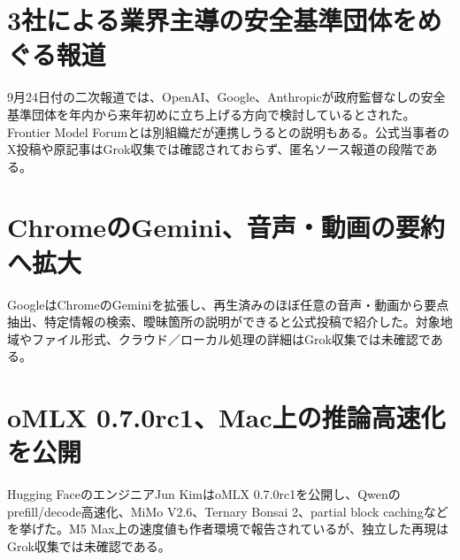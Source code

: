 \section{3社による業界主導の安全基準団体をめぐる報道}
9月24日付の二次報道では、OpenAI、Google、Anthropicが政府監督なしの安全基準団体を年内から来年初めに立ち上げる方向で検討しているとされた。Frontier Model Forumとは別組織だが連携しうるとの説明もある。公式当事者のX投稿や原記事はGrok収集では確認されておらず、匿名ソース報道の段階である。

\section{ChromeのGemini、音声・動画の要約へ拡大}
GoogleはChromeのGeminiを拡張し、再生済みのほぼ任意の音声・動画から要点抽出、特定情報の検索、曖昧箇所の説明ができると公式投稿で紹介した。対象地域やファイル形式、クラウド／ローカル処理の詳細はGrok収集では未確認である。

\section{oMLX 0.7.0rc1、Mac上の推論高速化を公開}
Hugging FaceのエンジニアJun KimはoMLX 0.7.0rc1を公開し、Qwenのprefill/decode高速化、MiMo V2.6、Ternary Bonsai 2、partial block cachingなどを挙げた。M5 Max上の速度値も作者環境で報告されているが、独立した再現はGrok収集では未確認である。

